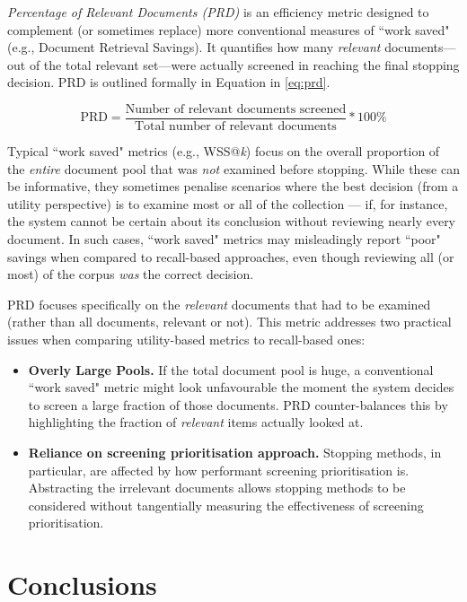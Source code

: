 \documentclass[10pt,oneside]{book}
\begin{document}
\emph{Percentage of Relevant Documents (PRD)} is an efficiency metric designed to complement (or sometimes replace) more conventional measures of ``work saved" (e.g., Document Retrieval Savings). It quantifies how many \emph{relevant} documents—out of the total relevant set—were actually screened in reaching the final stopping decision. PRD is outlined formally in Equation in \ref{eq:prd}.

\begin{equation}
\text{PRD} = \frac{\text{Number of relevant documents screened}}{\text{Total number of relevant documents}} * 100\%
\label{eq:prd}
\end{equation}

Typical ``work saved" metrics (e.g., WSS@\textit{k}) focus on the overall proportion of the \emph{entire} document pool that was \emph{not} examined before stopping. While these can be informative, they sometimes penalise scenarios where the best decision (from a utility perspective) is to examine most or all of the collection — if, for instance, the system cannot be certain about its conclusion without reviewing nearly every document. In such cases, ``work saved" metrics may misleadingly report ``poor" savings when compared to recall-based approaches, even though reviewing all (or most) of the corpus \emph{was} the correct decision.

PRD focuses specifically on the \emph{relevant} documents that had to be examined (rather than all documents, relevant or not). This metric addresses two practical issues when comparing utility-based metrics to recall-based ones:

\begin{itemize}
    \item \textbf{Overly Large Pools.} If the total document pool is huge, a conventional ``work saved" metric might look unfavourable the moment the system decides to screen a large fraction of those documents. PRD counter-balances this by highlighting the fraction of \emph{relevant} items actually looked at. 
    \item \textbf{Reliance on screening prioritisation approach.} Stopping methods, in particular, are affected by how performant screening prioritisation is. Abstracting the irrelevant documents allows stopping methods to be considered without tangentially measuring the effectiveness of screening prioritisation.
\end{itemize}


\section{Conclusions}
\end{document}
